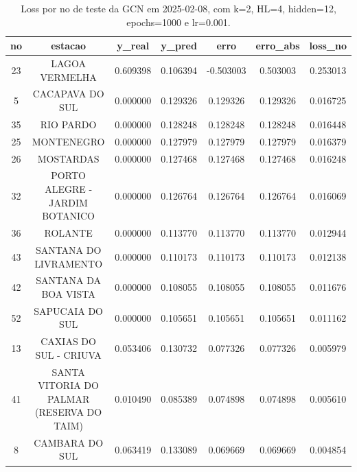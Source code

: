 \begin{table}[h]
\centering
\caption{Loss por no de teste da GCN em 2025-02-08, com k=2, HL=4, hidden=12, epochs=1000 e lr=0.001.}
\label{tab:gcn_loss_k2_hl4_h12_e1000_d20250208}
\begin{tabular}{ccccccc}
\toprule
no & estacao & y\_real & y\_pred & erro & erro\_abs & loss\_no \\
\midrule
23 & LAGOA VERMELHA & 0.609398 & 0.106394 & -0.503003 & 0.503003 & 0.253013 \\
5 & CACAPAVA DO SUL & 0.000000 & 0.129326 & 0.129326 & 0.129326 & 0.016725 \\
35 & RIO PARDO & 0.000000 & 0.128248 & 0.128248 & 0.128248 & 0.016448 \\
25 & MONTENEGRO & 0.000000 & 0.127979 & 0.127979 & 0.127979 & 0.016379 \\
26 & MOSTARDAS & 0.000000 & 0.127468 & 0.127468 & 0.127468 & 0.016248 \\
32 & PORTO ALEGRE - JARDIM BOTANICO & 0.000000 & 0.126764 & 0.126764 & 0.126764 & 0.016069 \\
36 & ROLANTE & 0.000000 & 0.113770 & 0.113770 & 0.113770 & 0.012944 \\
43 & SANTANA DO LIVRAMENTO & 0.000000 & 0.110173 & 0.110173 & 0.110173 & 0.012138 \\
42 & SANTANA DA BOA VISTA & 0.000000 & 0.108055 & 0.108055 & 0.108055 & 0.011676 \\
52 & SAPUCAIA DO SUL & 0.000000 & 0.105651 & 0.105651 & 0.105651 & 0.011162 \\
13 & CAXIAS DO SUL - CRIUVA & 0.053406 & 0.130732 & 0.077326 & 0.077326 & 0.005979 \\
41 & SANTA VITORIA DO PALMAR (RESERVA DO TAIM) & 0.010490 & 0.085389 & 0.074898 & 0.074898 & 0.005610 \\
8 & CAMBARA DO SUL & 0.063419 & 0.133089 & 0.069669 & 0.069669 & 0.004854 \\
\bottomrule
\end{tabular}
\end{table}
